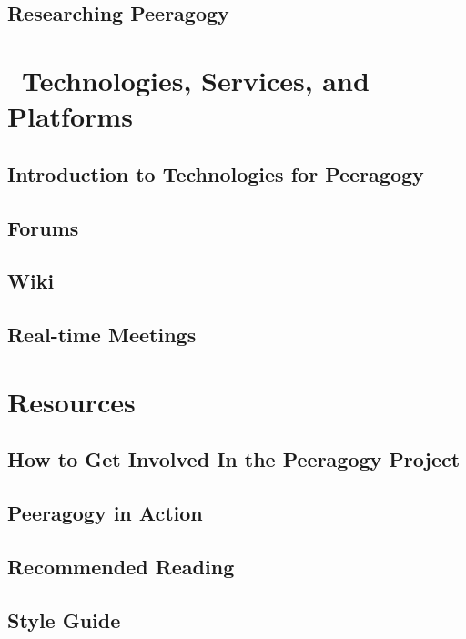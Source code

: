 \documentclass[ebook, 12pt, twoside]{memoir}
\begin{document}
\chapter[\textbf{Researching Peeragogy}]{Researching Peeragogy}
%



\part{~Technologies, Services, and Platforms } \label{technologies-part} %
%
\chapter[\textbf{Peeragogy Technology}]{Introduction to Technologies for Peeragogy}

%
\chapter[\textbf{Forums}]{ Forums } 
%

%
\chapter[\textbf{Wiki}]{ Wiki } 
%

%
\chapter[\textbf{Real-time Meetings}]{ Real-time Meetings } 
%



\part{Resources} \label{resources-part} %
%
\chapter[\textbf{How to get involved}]{ How to Get Involved In the Peeragogy Project } 
%

%
\chapter[\textbf{Peeragogy in Action}]{Peeragogy in Action}
%

%
\chapter[\textbf{Recommended Reading}]{Recommended Reading}
%

%
\chapter[\textbf{Style Guide}]{Style Guide}
%

%
\end{document}
